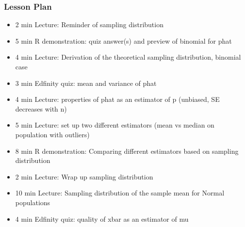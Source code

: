 

\begin{frame}
\frametitle{Lesson Plan}
\begin{itemize}
    \item 2 min Lecture: Reminder of sampling distribution
    \item 5 min R demonstration: quiz answer(s) and preview of binomial for phat
    \item 4 min Lecture: Derivation of the theoretical sampling distribution, binomial case
    \item 3 min Edfinity quiz: mean and variance of phat
    \item 4 min Lecture: properties of phat as an estimator of p (unbiased, SE decreases with n)
    \item 5 min Lecture: set up two different estimators (mean vs median on population with outliers) 
    \item 8 min R demonstration: Comparing different estimators based on sampling distribution 
    \item 2 min Lecture: Wrap up sampling distribution

    \item 10 min Lecture: Sampling distribution of the sample mean for Normal populations 
    \item 4 min Edfinity quiz: quality of xbar as an estimator of mu
    
 \end{itemize}
\end{frame}
    

